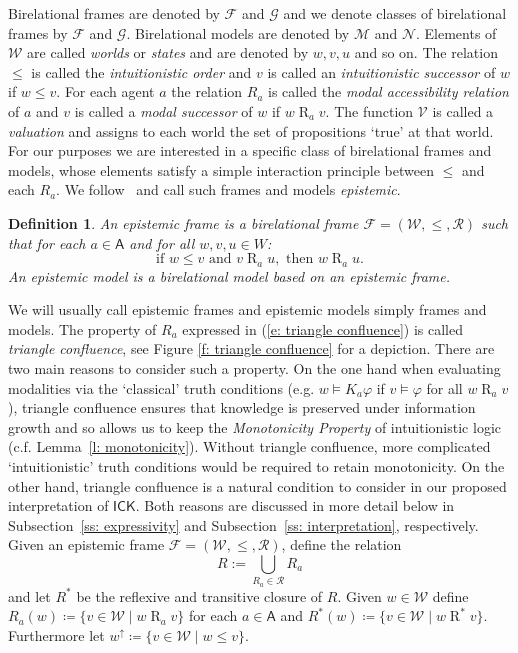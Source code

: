 \documentclass{myifcolog}
\newcommand\A{\mathsf{A}}
\newcommand{\agi}{a}
\newcommand{\ICK}{\mathsf{ICK}}
\newcommand{\fw}{\mathcal{M}}
\newcommand{\fv}{\mathcal{N}}
\newcommand{\Rel}{\mathrel{R}}
\newcommand{\W}{\mathcal{W}}
\newcommand{\rel}{\mathcal{R}}
\newcommand{\Fr}{\mathcal{F}}
\newcommand{\Gr}{\mathcal{G}}
\newcommand{\Frc}{\mathscr{F}}
\newcommand{\Grc}{\mathscr{G}}
\newcommand{\V}{\mathcal{V}}
\newtheorem{definition}[theorem]{Definition}
\numberwithin{theorem}{section}
\begin{document}
Birelational frames are denoted by $\Fr$ and $\Gr$ and we denote classes of birelational frames by $\Frc$ and $\Grc$. Birelational models are denoted by $\fw$ and $\fv$. Elements of $\W$ are called \emph{worlds} or \emph{states} and are denoted by $w,v,u$ and so on. The relation $\leq$ is called the \emph{intuitionistic order} and $v$ is called an \emph{intuitionistic successor} of $w$ if $w \leq v$. For each agent $\agi$ the relation $R_\agi$ is called the \emph{modal accessibility relation} of $\agi$ and $v$ is called a \emph{modal successor} of $w$ if $w \Rel_\agi v$. The function $\V$ is called a \emph{valuation} and assigns to each world the set of propositions `true' at that world. For our purposes we are interested in a specific class of birelational frames and models, whose elements satisfy a simple interaction principle between $\leq$ and each $R_\agi$. We follow~\cite{jager-intuitionistic_2016} and call such frames and models \emph{epistemic}.

\begin{definition}\label{d: model}
    An \emph{epistemic frame} is a birelational frame $\Fr= (\W, \leq, \rel)$ such that for each $\agi \in \A$ and for all $w,v,u \in W$:
        \begin{equation}\label{e: triangle confluence}
            \text{if } w \leq v \text{ and } v \Rel_\agi u, \text{ then } w \Rel_\agi u.
        \end{equation}
    An \emph{epistemic model} is a birelational model based on an epistemic frame.
\end{definition}

We will usually call epistemic frames and epistemic models simply frames and models. The property of $R_\agi$ expressed in (\ref{e: triangle confluence}) is called \emph{triangle confluence}, see Figure \ref{f: triangle confluence} for a depiction. There are two main reasons to consider such a property. On the one hand when evaluating modalities via the `classical' truth conditions (e.g. $w \models K_\agi \varphi$ if $v \models \varphi$ for all $w \Rel_\agi v$), triangle confluence ensures that knowledge is preserved under information growth and so allows us to keep the \emph{Monotonicity Property} of intuitionistic logic (c.f. Lemma~\ref{l: monotonicity}). Without triangle confluence, more complicated `intuitionistic' truth conditions would be required to retain monotonicity. On the other hand, triangle confluence is a natural condition to consider in our proposed interpretation of $\ICK$. Both reasons are discussed in more detail below in Subsection~\ref{ss: expressivity} and Subsection~\ref{ss: interpretation}, respectively. Given an epistemic frame $\Fr=(\W, \leq, \rel)$, define the relation
\begin{equation*}
    R := \bigcup_{R_\agi \in \rel} R_\agi
\end{equation*}
and let $R^*$ be the reflexive and transitive closure of $R$. Given $w \in \W$ define $R_\agi(w) \coloneqq \{v \in \W \mid w \Rel_\agi v\}$ for each $\agi \in \A$ and $R^*(w) \coloneqq {\{v \in \W \mid w \Rel^* v\}}$. Furthermore let $w^\uparrow \coloneqq \{ v \in \W \mid w \leq v\}$.
\end{document}
